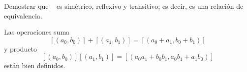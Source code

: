 \documentclass[main.tex]{subfiles}
\begin{document}
\begin{example}
    Demostrar que ~ es sim\'etrico, reflexivo y transitivo; es decir, es una relaci\'on de equivalencia.
\end{example}

\begin{proposition}
    Las operaciones suma
    $$[(a_0, b_0)] + [(a_1, b_1)] = [(a_0 + a_1, b_0 + b_1)]$$
    y producto
    $$[(a_0, b_0)][(a_1, b_1)] = [(a_0 a_1 + b_0 b_1, a_0 b_1 + a_1 b_0)]$$
    est\'an bien definidos.
\end{proposition}
\end{document}
